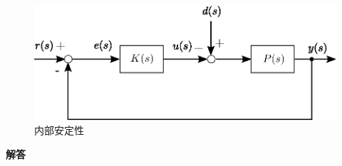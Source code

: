 \documentclass[a4paper,11pt]{jarticle}
\begin{document}
\newpage
\begin{figure}[t]
  \begin{center}
  \includegraphics[scale=0.9]{../figure/eps/statability.eps}
  \caption{内部安定性}
  \label{statability}
 \end{center}
\end{figure}
{\Large{\bf 解答}}
\vspace{2mm}
\end{document}
